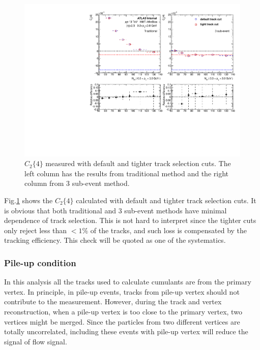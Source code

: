 \begin{figure}[H]
\centering
\includegraphics[width=0.8\linewidth]{figs/sec_sys/pp13/sys_pp13_trkSlc.pdf}
\caption{$C_{2}\{4\}$ measured with default and tighter track selection cuts. The left column has the results from traditional method and the right column from 3 sub-event method.}
\label{fig:sys_pp13_trkSlc}
\end{figure}
Fig.\ref{fig:sys_pp13_trkSlc} shows the $C_{2}\{4\}$ calculated with default and tighter track selection cuts. It is obvious that both traditional and 3 sub-event methods have minimal dependence of track selection. This is not hard to interpret since the tighter cuts only reject less than $<1\%$ of the tracks, and such loss is compensated by the tracking efficiency. This check will be quoted as one of the systematics.



\subsubsection{Pile-up condition}
In this analysis all the tracks used to calculate cumulants are from the primary vertex. In principle, in pile-up events, tracks from pile-up vertex should not contribute to the measurement. However, during the track and vertex reconstruction, when a pile-up vertex is too close to the primary vertex, two vertices might be merged. Since the particles from two different vertices are totally uncorrelated, including these events with pile-up vertex will reduce the signal of flow signal.

